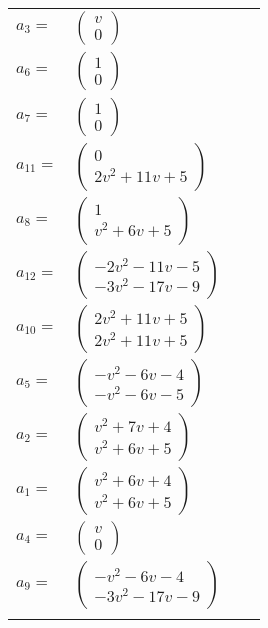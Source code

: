 \documentclass[1p]{elsarticle_modified}
\theoremstyle{definition}
\begin{document}
\begin{tabular}{m{7pt} m{180pt} m{7pt} m{180pt} }
\flushright $a_{3}=$&$\begin{pmatrix}v\\0\end{pmatrix}$ \\
\flushright $a_{6}=$&$\begin{pmatrix}1\\0\end{pmatrix}$ \\
\flushright $a_{7}=$&$\begin{pmatrix}1\\0\end{pmatrix}$ \\
\flushright $a_{11}=$&$\begin{pmatrix}0\\2 v^2+11 v+5\end{pmatrix}$ \\
\flushright $a_{8}=$&$\begin{pmatrix}1\\v^2+6 v+5\end{pmatrix}$ \\
\flushright $a_{12}=$&$\begin{pmatrix}-2 v^2-11 v-5\\-3 v^2-17 v-9\end{pmatrix}$ \\
\flushright $a_{10}=$&$\begin{pmatrix}2 v^2+11 v+5\\2 v^2+11 v+5\end{pmatrix}$ \\
\flushright $a_{5}=$&$\begin{pmatrix}- v^2-6 v-4\\- v^2-6 v-5\end{pmatrix}$ \\
\flushright $a_{2}=$&$\begin{pmatrix}v^2+7 v+4\\v^2+6 v+5\end{pmatrix}$ \\
\flushright $a_{1}=$&$\begin{pmatrix}v^2+6 v+4\\v^2+6 v+5\end{pmatrix}$ \\
\flushright $a_{4}=$&$\begin{pmatrix}v\\0\end{pmatrix}$ \\
\flushright $a_{9}=$&$\begin{pmatrix}- v^2-6 v-4\\-3 v^2-17 v-9\end{pmatrix}$\\&\end{tabular}
\end{document}
